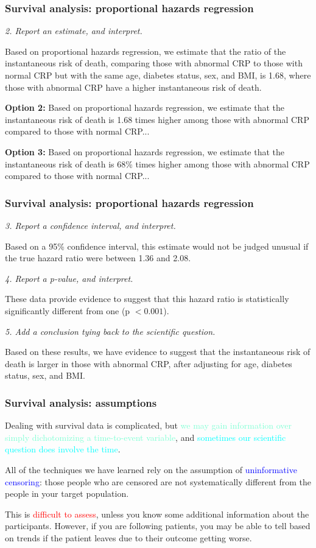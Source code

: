 \documentclass[12pt, 
hyperref={colorlinks=true, linkcolor=blue, urlcolor=cyan},dvipsnames]{beamer}
\begin{document}
\begin{frame}
\frametitle{Survival analysis: proportional hazards regression}

\textit{2. Report an estimate, and interpret.}

Based on proportional hazards regression, we estimate that the \textcolor{BurntOrange}{ratio of the instantaneous risk of death}, comparing those with abnormal CRP to those with normal CRP but with the same age, diabetes status, sex, and BMI, is \textcolor{BurntOrange}{1.68}, where those with abnormal CRP have a higher instantaneous risk of death. \pause

\textbf{Option 2:} Based on proportional hazards regression, we estimate that the \textcolor{BurntOrange}{instantaneous risk of death is 1.68 times higher} among those with abnormal CRP compared to those with normal CRP... \pause

\textbf{Option 3:} Based on proportional hazards regression, we estimate that the \textcolor{BurntOrange}{instantaneous risk of death is 68\% times higher} among those with abnormal CRP compared to those with normal CRP... 
\end{frame}

\begin{frame}
\frametitle{Survival analysis: proportional hazards regression}

\textit{3. Report a confidence interval, and interpret.}

Based on a 95\% confidence interval, this estimate would not be judged unusual if the true hazard ratio were between 1.36 and 2.08.

\textit{4. Report a p-value, and interpret.}

These data provide evidence to suggest that this hazard ratio is statistically significantly different from one (p $< 0.001$).

\textit{5. Add a conclusion tying back to the scientific question.}

Based on these results, we have evidence to suggest that the instantaneous risk of death is larger in those with abnormal CRP, after adjusting for age, diabetes status, sex, and BMI.
\end{frame}

\begin{frame}
\frametitle{Survival analysis: assumptions}

Dealing with survival data is complicated, but \textcolor{Aquamarine}{we may gain information over simply dichotomizing a time-to-event variable}, and \textcolor{cyan}{sometimes our scientific question does involve the time}.

All of the techniques we have learned rely on the assumption of \textcolor{blue}{uninformative censoring}: those people who are censored are not systematically different from the people in your target population.

This is \textcolor{red}{difficult to assess}, unless you know some additional information about the participants. However, if you are following patients, you may be able to tell based on trends if the patient leaves due to their outcome getting worse.

\end{frame}
\end{document}
